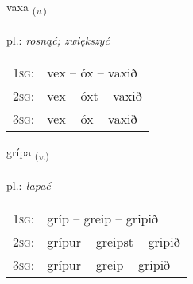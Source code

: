 \documentclass[frontgrid, backgrid]{flacards}\usepackage[]{graphicx}\usepackage[]{xcolor}
\begin{document}
\renewcommand{\flhead}{\vskip5pt \fboxsep=0pt {\small\bfseries\footnotesize Sagnorð | czasownik}}
\renewcommand{\fcfoot}{\vskip5pt \fboxsep=0pt \hspace{2pt}{\small\bfseries\footnotesize 1K}}

\renewcommand{\blhead}{\vskip5pt {\small\bfseries\footnotesize Sagnorð | czasownik }}
\renewcommand{\bcfoot}{\vskip5pt \hspace{2pt}{\small\bfseries\footnotesize 1K}}


{vaxa \small{\textsubscript{(\textit{v.})}} \\[1ex] %
\textphonetic{[vaksa]} \\
pl.: \emph{rosnąć; zwiększyć} \\  [2ex]
\renewcommand*{\arraystretch}{0.8}
\begin{tabular}{p{1cm}l}
\textsc{1sg}: & vex -- óx -- vaxið \\ 
\textsc{2sg}: & vex -- óxt -- vaxið \\ 
\textsc{3sg}: & vex -- óx -- vaxið \\ 
\end{tabular}
}

\renewcommand{\flhead}{\vskip5pt \fboxsep=0pt {\small\bfseries\footnotesize Sagnorð | czasownik}}
\renewcommand{\fcfoot}{\vskip5pt \fboxsep=0pt \hspace{2pt}{\small\bfseries\footnotesize 1K}}

\renewcommand{\blhead}{\vskip5pt {\small\bfseries\footnotesize Sagnorð | czasownik }}
\renewcommand{\bcfoot}{\vskip5pt \hspace{2pt}{\small\bfseries\footnotesize 1K}}


{grípa \small{\textsubscript{(\textit{v.})}} \\[1ex] %
\textphonetic{[kriːpa]} \\
pl.: \emph{łapać} \\  [2ex]
\renewcommand*{\arraystretch}{0.8}
\begin{tabular}{p{1cm}l}
\textsc{1sg}: & gríp -- greip -- gripið \\ 
\textsc{2sg}: & grípur -- greipst -- gripið \\ 
\textsc{3sg}: & grípur -- greip -- gripið \\ 
\end{tabular}
}
\end{document}
